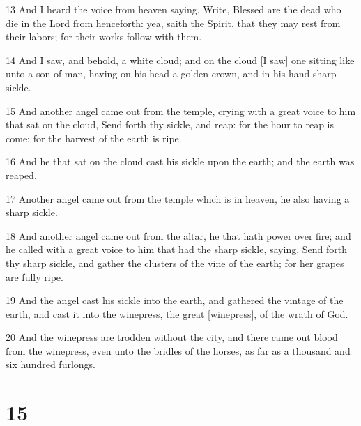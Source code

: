 \par 13 And I heard the voice from heaven saying, Write, Blessed are the dead who die in the Lord from henceforth: yea, saith the Spirit, that they may rest from their labors; for their works follow with them.
\par 14 And I saw, and behold, a white cloud; and on the cloud [I saw] one sitting like unto a son of man, having on his head a golden crown, and in his hand sharp sickle.
\par 15 And another angel came out from the temple, crying with a great voice to him that sat on the cloud, Send forth thy sickle, and reap: for the hour to reap is come; for the harvest of the earth is ripe.
\par 16 And he that sat on the cloud cast his sickle upon the earth; and the earth was reaped.
\par 17 Another angel came out from the temple which is in heaven, he also having a sharp sickle.
\par 18 And another angel came out from the altar, he that hath power over fire; and he called with a great voice to him that had the sharp sickle, saying, Send forth thy sharp sickle, and gather the clusters of the vine of the earth; for her grapes are fully ripe.
\par 19 And the angel cast his sickle into the earth, and gathered the vintage of the earth, and cast it into the winepress, the great [winepress], of the wrath of God.
\par 20 And the winepress are trodden without the city, and there came out blood from the winepress, even unto the bridles of the horses, as far as a thousand and six hundred furlongs.

\chapter{15}


